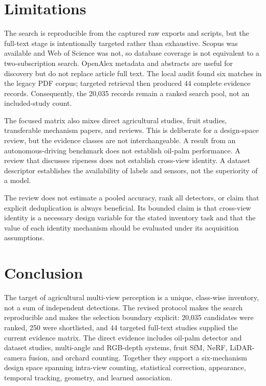 \section{Limitations}
\label{sec:limitations2}

The search is reproducible from the captured raw exports and scripts, but the full-text stage is intentionally targeted rather than exhaustive. Scopus was available and Web of Science was not, so database coverage is not equivalent to a two-subscription search. OpenAlex metadata and abstracts are useful for discovery but do not replace article full text. The local audit found six matches in the legacy PDF corpus; targeted retrieval then produced 44 complete evidence records. Consequently, the 20,035 records remain a ranked search pool, not an included-study count.

The focused matrix also mixes direct agricultural studies, fruit studies, transferable mechanism papers, and reviews. This is deliberate for a design-space review, but the evidence classes are not interchangeable. A result from an autonomous-driving benchmark does not establish oil-palm performance. A review that discusses ripeness does not establish cross-view identity. A dataset descriptor establishes the availability of labels and sensors, not the superiority of a model.

The review does not estimate a pooled accuracy, rank all detectors, or claim that explicit deduplication is always beneficial. Its bounded claim is that cross-view identity is a necessary design variable for the stated inventory task and that the value of each identity mechanism should be evaluated under its acquisition assumptions.

\section{Conclusion}
\label{sec:conclusion2}

The target of agricultural multi-view perception is a unique, class-wise inventory, not a sum of independent detections. The revised protocol makes the search reproducible and makes the selection boundary explicit: 20,035 candidates were ranked, 250 were shortlisted, and 44 targeted full-text studies supplied the current evidence matrix. The direct evidence includes oil-palm detector and dataset studies, multi-angle and RGB-depth systems, fruit SfM, NeRF, LiDAR-camera fusion, and orchard counting. Together they support a six-mechanism design space spanning intra-view counting, statistical correction, appearance, temporal tracking, geometry, and learned association.

